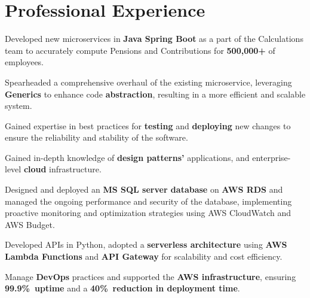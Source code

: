 
\section{Professional Experience}
\vspace{\topsep} %
\begin{tightemize}
  \item Developed new microservices in {\bf Java Spring Boot} as a part of the Calculations team to accurately compute Pensions and Contributions for {\bf 500,000+ } of employees.
  \item Spearheaded a comprehensive overhaul of the existing microservice, leveraging {\bf Generics} to enhance code {\bf abstraction}, resulting in a more efficient and scalable system.
  \item Gained expertise in best practices for {\bf testing} and {\bf deploying} new changes to ensure the reliability and stability of the software.
  \item Gained in-depth knowledge of {\bf design patterns'} applications, and enterprise-level {\bf cloud} infrastructure.
\end{tightemize}

\vspace{\topsep}


\begin{tightemize}
  \item Designed and deployed an {\bf MS SQL server database} on {\bf AWS RDS} and managed the ongoing performance and security of the database, implementing proactive monitoring and optimization strategies using AWS CloudWatch and AWS Budget.
  \item Developed APIs in Python, adopted a {\bf serverless architecture} using {\bf AWS Lambda Functions} and {\bf API Gateway} for scalability and cost efficiency.
  \item  Manage {\bf DevOps} practices and supported the {\bf AWS infrastructure}, ensuring {\bf99.9\%\ uptime} and a {\bf40\%\ reduction in deployment time}.
\end{tightemize}
